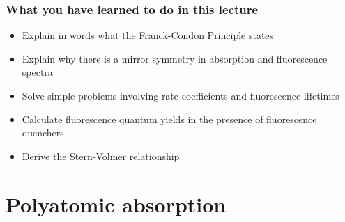 \documentclass[ignorenonframetext]{beamer}
\begin{document}
\begin{frame}
\frametitle{What you have learned to do in this lecture}
\begin{itemize}
\item Explain in words what the Franck-Condon Principle states
\item Explain why there is a mirror symmetry in absorption and fluorescence spectra
\item Solve simple problems involving rate coefficients and fluorescence lifetimes
\item Calculate fluorescence quantum yields in the presence of fluorescence quenchers
\item Derive the Stern-Volmer relationship
\end{itemize}
\end{frame}

\section{Polyatomic absorption}

	
\end{document}
